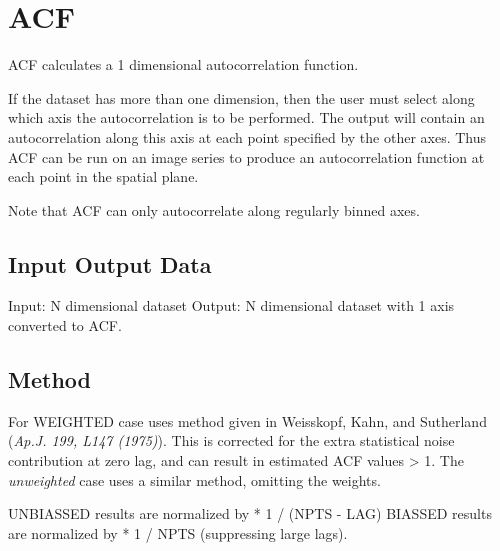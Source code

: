 \documentclass{book}
\renewcommand{\_}{{\tt\char'137}}     %
\begin{document}
\section{ACF}
ACF calculates a 1 dimensional autocorrelation function.
 
If the dataset has more than one dimension, then the user must
select along which axis the autocorrelation is to be performed.
The output will contain an autocorrelation along this axis at
each point specified by the other axes. Thus ACF can be run on an
image series to produce an autocorrelation function at each point
in the spatial plane.
 
Note that ACF can only autocorrelate along regularly binned axes.
 
\subsection{Input Output Data}
Input: N dimensional dataset
Output: N dimensional dataset with 1 axis converted to ACF.
\subsection{Method}
For WEIGHTED case uses method given in Weisskopf, Kahn, and
Sutherland ({\em Ap.J. 199, L147 (1975)}). This is corrected for
the extra statistical noise contribution at zero lag, and
can result in estimated ACF values > 1. The {\em unweighted} case
uses a similar method, omitting the weights.
 
UNBIASSED results are normalized by * 1 / (NPTS - LAG)
BIASSED results are normalized by * 1 / NPTS (suppressing large
lags).
 
\end{document}
